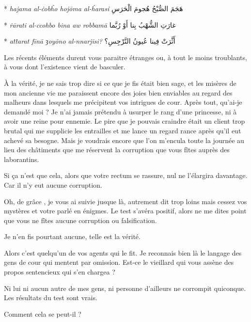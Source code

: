 \begin{drama}
\begin{paracol}{2}
      \switchcolumn[0]*
      \emph{hajama al-ċobĥo hojōma al-ĥarasi}
      \switchcolumn[1]
      \hfill\textarabic{هَجَمَ الصُّبْحُ هُجومَ الْحَرَسِ}
      
      \switchcolumn[0]*
      \emph{ṙārati al-ccohbo bina aw robbamā}
      \switchcolumn[1]
      \hfill\textarabic{غارَتِ الشُّهْبُ بِنا أَوْ رُبَّما}
      
      \switchcolumn[0]*
      \emph{aṫṫarat fīnā {\libertine{}ȝ}oyōno al-nnarjisi?}
      \switchcolumn[1]
      \hfill\textarabic{أَثَّرَتْ فِينا عُيونُ النَّرْجِسِ؟}
    \end{paracol}

   \elenaspeaks Les récents éléments durent vous paraitre étranges ou, à tout le moins troublants, à vous dont l’existence vient de basculer.

   \elaspeaks À la vérité, je ne sais trop dire si ce que je fis était bien sage, et les misères de mon ancienne vie me paraissent encore des joies bien enviables au regard des malheurs dans lesquels me précipitent vos intrigues de cour. Après tout, qu’ai-je demandé moi ? Je n’ai jamais prétendu à usurper le rang d’une princesse, ni à avoir une reine pour ennemie. Le pire que je pouvais craindre était un client trop brutal qui me supplicie les entrailles et me lance un regard rance après qu’il eut achevé sa besogne. 
   Mais je voudrais encore que l’on m’encula toute la journée au lieu des châtiments que me réservent la corruption que vous fîtes auprès des laborantins.

   \elenaspeaks Si ça n’est que cela, alors que votre rectum se rassure, nul ne l’élargira davantage. Car il n’y eut aucune corruption.

   \elaspeaks Oh, de grâce \elena, je vous ai suivie jusque là, autrement dit trop loins mais cessez vos mystères et votre parlé en énigmes. Le test s’avéra positif, alors ne me dites point que vous ne fîtes aucune corruption ou falsification.

   \elenaspeaks Je n’en fis pourtant aucune, telle est la vérité.

   \elaspeaks Alors c’est quelqu’un de vos agents qui le fit. Je reconnais bien là le langage des gens de cour qui mentent par omission. Est-ce le vieillard qui vous assène des propos sentencieux qui s’en chargea ?

   \elenaspeaks Ni lui ni aucun autre de mes gens, ni personne d’ailleurs ne corrompit quiconque. Les résultats du test sont vrais.

   \elaspeaks Comment cela se peut-il ?


\end{drama}
